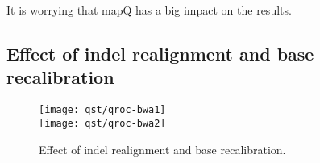 \documentclass{bioinfo}
\begin{document}
It is worrying that mapQ has a big impact on the results.

\subsection{Effect of indel realignment and base recalibration}

\begin{figure}[!hp]
\centering\texttt{[image: qst/qroc-bwa1]}\\
\centering\texttt{[image: qst/qroc-bwa2]}
\caption{Effect of indel realignment and base recalibration.}\label{fig:qroc2} \end{figure}

\end{document}

